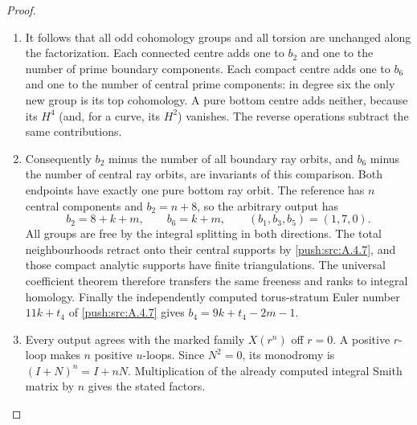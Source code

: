 \begin{proof}
\begin{enumerate}[label=\arabic*.,leftmargin=*]
\item It follows that all odd cohomology groups and all
torsion are unchanged along the factorization. Each
connected centre adds one to $b_2$ and one to the number
of prime boundary components. Each compact centre
adds one to $b_6$ and one to the number of central
prime components: in degree six the only new group
is its top cohomology. A pure bottom centre adds
neither, because its $H^4$ (and, for a curve, its
$H^2$) vanishes. The reverse operations subtract
the same contributions.

\item Consequently $b_2$ minus the number of all boundary
ray orbits, and $b_6$ minus the number of central ray
orbits, are invariants of this comparison. Both
endpoints have exactly one pure bottom ray orbit.
The reference has $n$ central components and
$b_2=n+8$, so the arbitrary output has
\[
 b_2=8+k+m,\qquad b_6=k+m,
 \qquad (b_1,b_3,b_5)=(1,7,0).
\]
All groups are free by the integral splitting in both
directions. The total neighbourhoods retract onto
their central supports by \ref{push:src:A.4.7}, and those compact
analytic supports have finite triangulations. The
universal coefficient theorem therefore transfers
the same freeness and ranks to integral homology.
Finally the independently computed torus-stratum
Euler number $11k+t_4$ of \ref{push:src:A.4.7} gives
$b_4=9k+t_4-2m-1$.

\item Every output agrees with the marked family
$X(r^n)$ off $r=0$. A positive $r$-loop makes $n$
positive $u$-loops. Since $N^2=0$, its monodromy is
$(I+N)^n=I+nN$. Multiplication of the already computed
integral Smith matrix by $n$ gives the stated factors.

\end{enumerate}
\end{proof}
